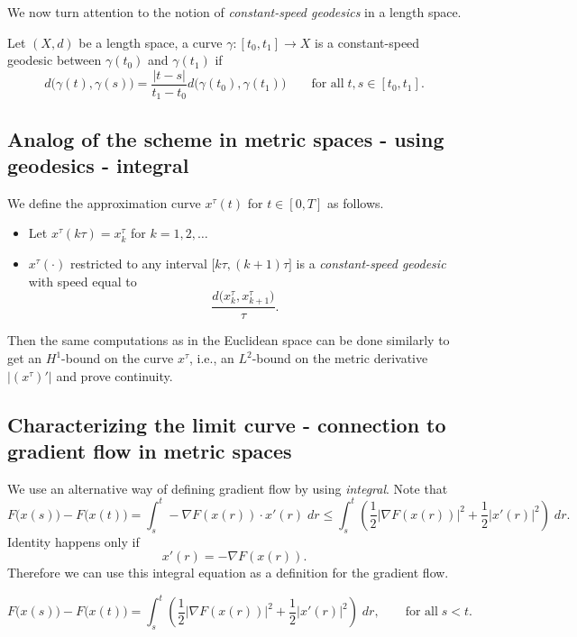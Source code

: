 We now turn attention to the notion of \emph{constant-speed geodesics} in a length space.

\begin{defn} Let $(X,d)$ be a length space, a curve $\gamma:[t_0,t_1]\to X$ is a constant-speed geodesic between $\gamma(t_0)$ and $\gamma(t_1)$ if 
\begin{equation*}
    d\big(\gamma(t),\gamma(s)\big) = \frac{|t-s|}{t_1-t_0} d\big(\gamma(t_0),\gamma(t_1)\big) \qquad\text{for all}\; t,s \in [t_0,t_1].
\end{equation*}
\end{defn}

\subsection{Analog of the scheme in metric spaces - using geodesics - integral}
We define the approximation curve $x^\tau(t)$ for $t\in [0,T]$ as follows.
\begin{itemize}
    \item Let $x^\tau(k\tau) = x^\tau_k$ for $k=1,2,\ldots$
    \item $x^\tau(\cdot)$ restricted to any interval $\big[k\tau, (k+1)\tau\big]$ is a \emph{constant-speed geodesic} with speed equal to 
    \begin{equation*}
        \frac{d\big(x^\tau_k, x^\tau_{k+1}\big)}{\tau}.
    \end{equation*}
\end{itemize}
Then the same computations as in the Euclidean space can be done similarly to get an $H^1$-bound on the curve $x^\tau$, i.e., an $L^2$-bound on the metric derivative $\big|(x^\tau)'\big|$ and prove continuity.
\subsection{Characterizing the limit curve - connection to gradient flow in metric spaces}
We use an alternative way of defining gradient flow by using \emph{integral}. Note that 
\begin{equation*}
    F\big(x(s)\big) - F\big(x(t)\big) = \int_s^t -\nabla F(x(r))\cdot x'(r)\;dr \leq \int_s^t\left(\frac{1}{2}|\nabla F(x(r))|^2 + \frac{1}{2}|x'(r)|^2\right)\;dr.
\end{equation*}
Identity happens only if 
\begin{equation*}
    x'(r) = -\nabla F(x(r)).
\end{equation*}
Therefore we can use this integral equation as a definition for the gradient flow.
\begin{defn} 
\begin{equation*}
    F\big(x(s)\big) - F\big(x(t)\big) = \int_s^t\left(\frac{1}{2}|\nabla F(x(r))|^2 + \frac{1}{2}|x'(r)|^2\right)\;dr, \qquad \text{for all}\;s<t.
\end{equation*}
\end{defn}

